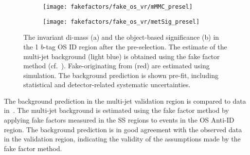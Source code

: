 \begin{figure}[htbp]
  \centering

  \begin{subfigure}{0.45\textwidth}
    \texttt{[image: fakefactors/fake\_os\_vr/mMMC\_presel]}
    \subcaption{}
  \end{subfigure}\hspace*{0.04\textwidth}%
  \begin{subfigure}{0.45\textwidth}
    \texttt{[image: fakefactors/fake\_os\_vr/metSig\_presel]}
    \subcaption{}
  \end{subfigure}

  \caption{The invariant di-\tauhad mass (a) and the object-based
    \pTmissAbs significance (b) in the 1 $b$-tag OS ID region after
    the pre-selection. The estimate of the multi-jet background (light
    blue) is obtained using the fake factor method (cf.\
    ). Fake-\tauhadvis originating from
    \ttbar (red) are estimated using simulation. The background
    prediction is shown pre-fit, including statistical and
    detector-related systematic uncertainties.}
  \label{fig:fake_factor_OSVR_cutvars}
\end{figure}

The background prediction in the multi-jet validation region is
compared to data in~. The
multi-jet background is estimated using the fake factor method by
applying fake factors measured in the SS regions to events in the OS
Anti-ID region. The background prediction is in good agreement with
the observed data in the validation region, indicating the validity of
the assumptions made by the fake factor method.

